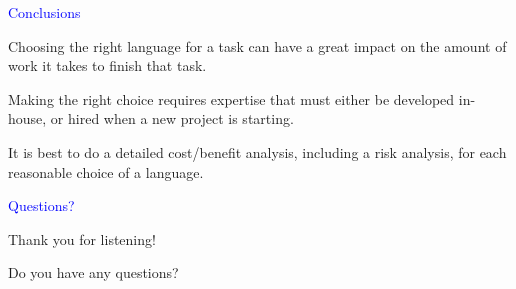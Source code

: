 \documentclass{slides}
\newcommand{\ti}[1]{\begin{center}\Large{\textcolor{blue}{#1}}\end{center}}
\begin{document}
\begin{slide}\ti{Conclusions}

Choosing the right language for a task can have a great impact on the
amount of work it takes to finish that task.

Making the right choice requires expertise that must either be
developed in-house, or hired when a new project is starting.

It is best to do a detailed cost/benefit analysis, including a risk
analysis, for each reasonable choice of a language.

\vfill\end{slide}
\begin{slide}\ti{Questions?}

Thank you for listening!

Do you have any questions?

\vfill\end{slide}



\end{document}
